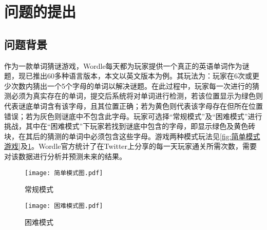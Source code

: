 \documentclass{MathModeling}
\begin{document}
\begin{abstract}
		{\heiti 针对问题四}，本文结合\textbf{散点、核密度、折线、雷达、小提琴等图}进行分析，得出更深层次结论，具体分析结果见{\heiti \textcolor{blue}{}}。

		{\heiti 针对问题五}，本文综合上述问题的分析，向纽约时报的谜题编辑总结结果并提出相关建议，本文提供英文及中文信函各一份，具体见{\heiti \textcolor{blue}{}}。

		最后，本文对所建立的模型进行中肯评价、提出改进措施，并对模型进行一定推广。
	\end{abstract}

	\section{问题的提出}
	\subsection{问题背景}
	作为一款单词猜谜游戏，Wordle每天都为玩家提供一个真正的英语单词作为谜题，现已推出60多种语言版本，本文以英文版本为例。其玩法为：玩家在6次或更少次数内猜出一个5个字母的单词以解决谜题。在此过程中，玩家每一次进行的猜测必须为真实存在的单词，提交后系统将对单词进行检测，若该位置显示为绿色则代表谜底单词含有该字母，且其位置正确；若为黄色则代表该字母存在但所在位置错误；若为灰色则谜底中不包含此字母。玩家可选择“常规模式”及“困难模式”进行挑战，其中在“困难模式”下玩家若找到谜底中包含的字母，即显示绿色及黄色砖块，在其后的猜测的单词中必须包含这些字母。游戏两种模式玩法见\textcolor{blue}{\cref{fig:简单模式游戏}}及\textcolor{blue}{\cref{fig:困难模式游戏}}。Wordle官方统计了在Twitter上分享的每一天玩家通关所需次数，需要对该数据进行分析并预测未来的结果。
	\begin{figure}[H]
		\centering
		\begin{minipage}{0.48\linewidth}
			\centering
			\texttt{[image: 简单模式图.pdf]}
			\caption{常规模式}
			\label{fig:简单模式游戏}
		\end{minipage}
		\begin{minipage}{0.48\linewidth}
			\centering
			\texttt{[image: 困难模式图.pdf]}
			\caption{困难模式}
			\label{fig:困难模式游戏}
		\end{minipage}
	\end{figure}
\end{document}
